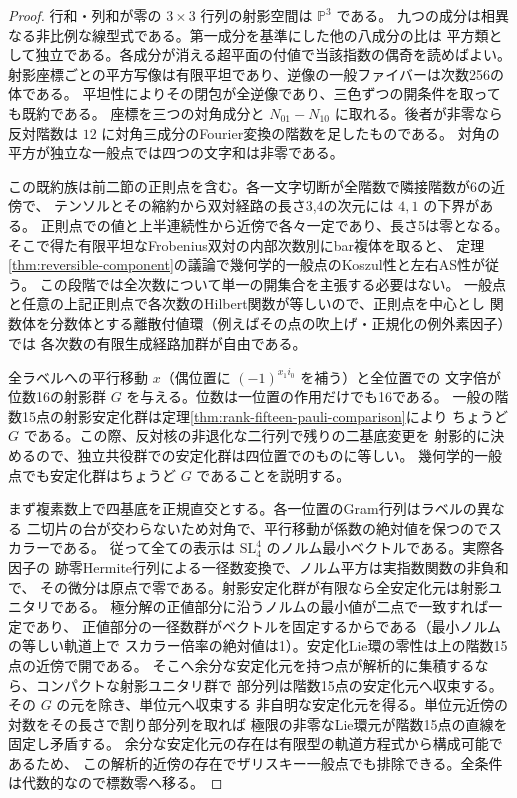 \begin{proof}
行和・列和が零の $3\times3$ 行列の射影空間は $\mathbb P^3$ である。
九つの成分は相異なる非比例な線型式である。第一成分を基準にした他の八成分の比は
平方類として独立である。各成分が消える超平面の付値で当該指数の偶奇を読めばよい。
射影座標ごとの平方写像は有限平坦であり、逆像の一般ファイバーは次数256の体である。
平坦性によりその閉包が全逆像であり、三色ずつの開条件を取っても既約である。
座標を三つの対角成分と $N_{01}-N_{10}$ に取れる。後者が非零なら
反対階数は $12$ に対角三成分のFourier変換の階数を足したものである。
対角の平方が独立な一般点では四つの文字和は非零である。

この既約族は前二節の正則点を含む。各一文字切断が全階数で隣接階数が6の近傍で、
テンソルとその縮約から双対経路の長さ3,4の次元には $4,1$ の下界がある。
正則点での値と上半連続性から近傍で各々一定であり、長さ5は零となる。
そこで得た有限平坦なFrobenius双対の内部次数別にbar複体を取ると、
定理\ref{thm:reversible-component}の議論で幾何学的一般点のKoszul性と左右AS性が従う。
この段階では全次数について単一の開集合を主張する必要はない。
一般点と任意の上記正則点で各次数のHilbert関数が等しいので、正則点を中心とし
関数体を分数体とする離散付値環（例えばその点の吹上げ・正規化の例外素因子）では
各次数の有限生成経路加群が自由である。

全ラベルへの平行移動 $x$（偶位置に $(-1)^{x_1i_0}$ を補う）と全位置での
文字倍が位数16の射影群 $G$ を与える。位数は一位置の作用だけでも16である。
一般の階数15点の射影安定化群は定理\ref{thm:rank-fifteen-pauli-comparison}により
ちょうど $G$ である。この際、反対核の非退化な二行列で残りの二基底変更を
射影的に決めるので、独立共役群での安定化群は四位置でのものに等しい。
幾何学的一般点でも安定化群はちょうど $G$ であることを説明する。

まず複素数上で四基底を正規直交とする。各一位置のGram行列はラベルの異なる
二切片の台が交わらないため対角で、平行移動が係数の絶対値を保つのでスカラーである。
従って全ての表示は $\mathrm{SL}_4^4$ のノルム最小ベクトルである。実際各因子の
跡零Hermite行列による一径数変換で、ノルム平方は実指数関数の非負和で、
その微分は原点で零である。射影安定化群が有限なら全安定化元は射影ユニタリである。
極分解の正値部分に沿うノルムの最小値が二点で一致すれば一定であり、
正値部分の一径数群がベクトルを固定するからである（最小ノルムの等しい軌道上で
スカラー倍率の絶対値は1）。安定化Lie環の零性は上の階数15点の近傍で開である。
そこへ余分な安定化元を持つ点が解析的に集積するなら、コンパクトな射影ユニタリ群で
部分列は階数15点の安定化元へ収束する。その $G$ の元を除き、単位元へ収束する
非自明な安定化元を得る。単位元近傍の対数をその長さで割り部分列を取れば
極限の非零なLie環元が階数15点の直線を固定し矛盾する。
余分な安定化元の存在は有限型の軌道方程式から構成可能であるため、
この解析的近傍の存在でザリスキー一般点でも排除できる。全条件は代数的なので標数零へ移る。


\end{proof}

